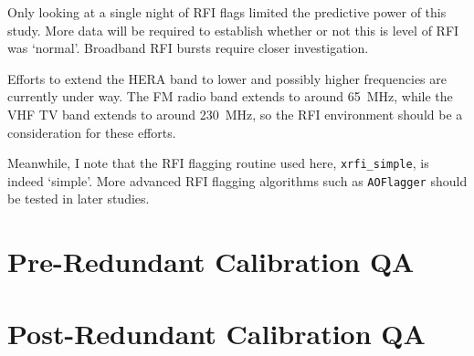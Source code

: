 Only looking at a single night of RFI flags limited the predictive power of this study. More data will be required to establish whether or not this is level of RFI was `normal'. Broadband RFI bursts require closer investigation.

Efforts to extend the HERA band to lower and possibly higher frequencies are currently under way. The FM radio band extends to around 65~MHz, while the VHF TV band extends to around 230~MHz, so the RFI environment should be a consideration for these efforts.

Meanwhile, I note that the RFI flagging routine used here, {\tt xrfi\_simple}, is indeed `simple'. More advanced RFI flagging algorithms such as {\tt AOFlagger} \citep{AOflag} should be tested in later studies.

\section{Pre-Redundant Calibration QA}

\section{Post-Redundant Calibration QA}
